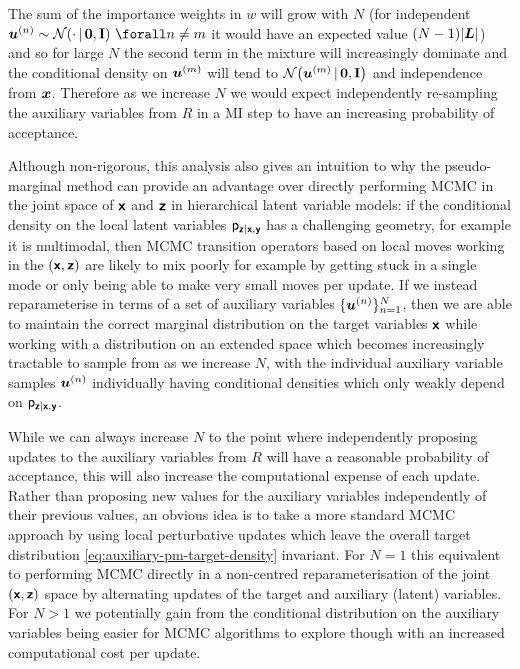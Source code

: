 The sum of the importance weights in $w$ will grow with $N$ (for independent $\vct{u}^{(n)} \sim \nrm{\cdot \gvn \vct{0},\mathbf{I}} ~\forall n \neq m$ it would have an expected value $(N-1)|\boldsymbol{L}|$) and so for large $N$ the second term in the mixture will increasingly dominate and the conditional density on $\boldsymbol{u}^{(m)}$ will tend to $\nrm{\vct{u}^{(m)}\gvn\vct{0},\mathbf{I}}$ and independence from $\boldsymbol{x}$. Therefore as we increase $N$ we would expect independently re-sampling the auxiliary variables from $R$ in a \ac{MI} step to have an increasing probability of acceptance.

Although non-rigorous, this analysis also gives an intuition to why the pseudo-marginal method can provide an advantage over directly performing \ac{MCMC} in the joint space of $\boldsymbol{\mathsf{x}}$ and $\boldsymbol{\mathsf{z}}$ in hierarchical latent variable models: if the conditional density on the local latent variables $\mathsf{p}_{\boldsymbol{\mathsf{z}}|\boldsymbol{\mathsf{x}},\boldsymbol{\mathsf{y}}}$ has a challenging geometry, for example it is multimodal, then \ac{MCMC} transition operators based on local moves working in the $(\boldsymbol{\mathsf{x}},\boldsymbol{\mathsf{z}})$ are likely to mix poorly for example by getting stuck in a single mode or only being able to make very small moves per update. If we instead reparameterise in terms of a set of auxiliary variables $\lbrace \boldsymbol{u}^{(n)} \rbrace_{n=1}^N$, then we are able to maintain the correct marginal distribution on the target variables $\boldsymbol{\mathsf{x}}$ while working with a distribution on an extended space which becomes increasingly tractable to sample from as we increase $N$, with the individual auxiliary variable samples $\boldsymbol{u}^{(n)}$ individually having conditional densities which only weakly depend on $\mathsf{p}_{\boldsymbol{\mathsf{z}}|\boldsymbol{\mathsf{x}},\boldsymbol{\mathsf{y}}}$.

While we can always increase $N$ to the point where independently proposing updates to the auxiliary variables from $R$ will have a reasonable probability of acceptance, this will also increase the computational expense of each update. Rather than proposing new values for the auxiliary variables independently of their previous values, an obvious idea is to take a more standard \ac{MCMC} approach by using local perturbative updates which leave the overall target distribution \eqref{eq:auxiliary-pm-target-density} invariant. For $N=1$ this equivalent to performing \ac{MCMC} directly in a non-centred reparameterisation \citep{papaspiliopoulos2003non} of the joint $(\boldsymbol{\mathsf{x}},\boldsymbol{\mathsf{z}})$ space by alternating updates of the target and auxiliary (latent) variables. For $N > 1$ we potentially gain from the conditional distribution on the auxiliary variables being easier for \ac{MCMC} algorithms to explore though with an increased computational cost per update.

